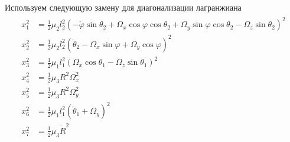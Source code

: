 \documentclass[12pt]{article}
\newcommand{\lb}{\left(}
\newcommand{\rb}{\right)}
\begin{document}

Используем следующую замену для диагонализации лагранжиана
\begin{gather}
	\begin{aligned}
			x_1^2 &= \frac{1}{2} \mu_2 l_2^2 \lb - \dot{\varphi} \sin \theta_2 + \Omega_x \cos \varphi \cos \theta_2 + \Omega_y \sin \varphi \cos \theta_2 - \Omega_z \sin \theta_2 \rb^2 \\
			x_2^2 &= \frac{1}{2} \mu_2 l_2^2 \lb \dot{\theta}_2 - \Omega_x \sin \varphi + \Omega_y \cos \varphi \rb^2 \\
			x_3^2 &= \frac{1}{2} \mu_1 l_1^2 \lb \Omega_x \cos \theta_1 - \Omega_z \sin \theta_1 \rb^2 \\
			x_4^2 &= \frac{1}{2} \mu_3 R^2 \Omega_x^2 \\
			x_5^2 &= \frac{1}{2} \mu_3 R^2 \Omega_y^2 \\
			x_6^2 &= \frac{1}{2} \mu_1 l_1^2 \lb \dot{\theta}_1  + \Omega_y \rb^2 \\
			x_7^2 &= \frac{1}{2} \mu_3 \dot{R}^2 
	\end{aligned} \label{n2n2_1}
\end{gather}
\end{document}
